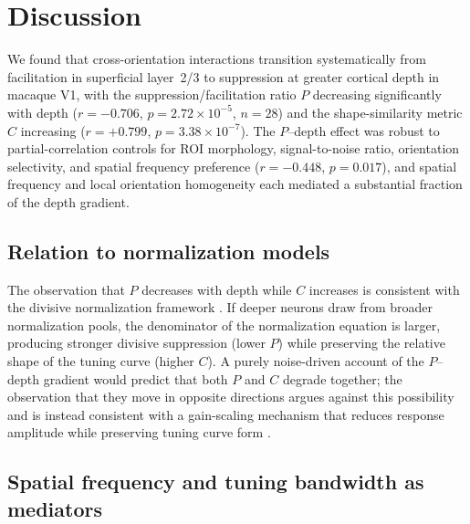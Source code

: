 \documentclass[11pt,letterpaper]{article}
\begin{document}
\section{Discussion}

We found that cross-orientation interactions transition systematically from
facilitation in superficial layer~2/3 to suppression at greater cortical
depth in macaque V1, with the suppression/facilitation ratio $P$ decreasing
significantly with depth ($r = -0.706$, $p = 2.72 \times 10^{-5}$, $n = 28$)
and the shape-similarity metric $C$ increasing ($r = +0.799$,
$p = 3.38 \times 10^{-7}$). The $P$--depth effect was robust to
partial-correlation controls for ROI morphology, signal-to-noise ratio,
orientation selectivity, and spatial frequency preference
($r = -0.448$, $p = 0.017$), and spatial frequency and local orientation
homogeneity each mediated a substantial fraction of the depth gradient.

\subsection{Relation to normalization models}

The observation that $P$ decreases with depth while $C$ increases is
consistent with the divisive normalization framework
\citep{heeger1992, carandini2012}. If deeper neurons draw from broader
normalization pools, the denominator of the normalization equation is larger,
producing stronger divisive suppression (lower $P$) while preserving the
relative shape of the tuning curve (higher $C$). A purely noise-driven
account of the $P$--depth gradient would predict that both $P$ and $C$
degrade together; the observation that they move in opposite directions argues
against this possibility and is instead consistent with a gain-scaling
mechanism that reduces response amplitude while preserving tuning curve form
\citep{carandini1997}.

\subsection{Spatial frequency and tuning bandwidth as mediators}
\end{document}
